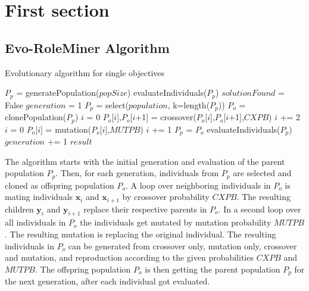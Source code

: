 \newpage
\section{First section}

\subsection{Evo-RoleMiner Algorithm}
\begin{algorithm}
   	\caption{Evolutionary algorithm for single objectives}
   	\label{alg:EA}
   	\begin{algorithmic}[1]
   		\State $P_p$ = generatePopulation($popSize$)
   		\State evaluateIndividuals($P_p$)
   		\State $solutionFound$ = False
   		\State $generation$ = 1
   		\State $P_p$ = select($population$, k=length($P_p$))
   		\State $P_o$ = clonePopulation($P_p$)
   		\State $i$ = 0
   		\State $P_o$[$i$],$P_o$[$i$+1] = crossover($P_o$[$i$],$P_o$[$i$+1],$CXPB$)
   		\State $i$ += 2
   		\EndWhile
   		\State $i$ = 0
   		\State $P_o$[$i$] = mutation($P_o$[$i$],$MUTPB$)
   		\State $i$ += 1
   		\EndWhile
   		\State $P_p$ = $P_o$
   		\State evaluateIndividuals($P_p$)
   		\State $generation$ += 1
   		\EndWhile
   		\State \Return $result$
   		\EndProcedure
   	\end{algorithmic}
\end{algorithm}
The algorithm starts with the initial generation and evaluation of the parent population $P_p$. Then, for each generation, individuals from $P_p$ are selected and cloned as offspring population $P_o$. A loop over neighboring individuals in $P_o$ is mating individuals $\mathbf{x}_i$ and $\mathbf{x}_{i+1}$ by crossover probability $CXPB$. The resulting children $\mathbf{y}_i$ and $\mathbf{y}_{i+1}$ replace their respective parents in $P_o$. In a second loop over all individuals in $P_o$ the individuals get mutated by mutation probability $MUTPB$. The resulting mutation is replacing the original individual. The resulting individuals in $P_o$ can be generated from crossover only, mutation only, crossover and mutation, and reproduction according to the given probabilities $CXPB$ and $MUTPB$. The offspring population $P_o$ is then getting the parent population $P_p$ for the next generation, after each individual got evaluated.

